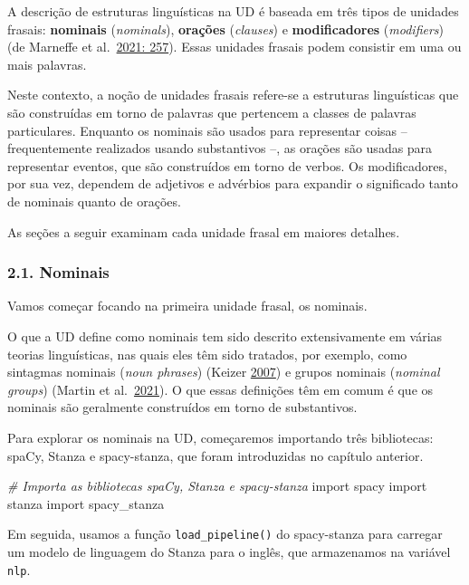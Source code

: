 \documentclass[
  brazilian,
]{article}
\newenvironment{Shaded}{}{}
\newcommand{\CommentTok}[1]{\textcolor[rgb]{0.38,0.63,0.69}{\textit{#1}}}
\newcommand{\ImportTok}[1]{#1}
\newcommand{\NormalTok}[1]{#1}
\begin{document}
A descrição de estruturas linguísticas na UD é baseada em três tipos de
unidades frasais: \textbf{nominais} (\emph{nominals}), \textbf{orações}
(\emph{clauses}) e \textbf{modificadores} (\emph{modifiers}) (de
Marneffe et al.~\href{https://doi.org/10.1162/coli_a_00402}{2021: 257}).
Essas unidades frasais podem consistir em uma ou mais palavras.

Neste contexto, a noção de unidades frasais refere-se a estruturas
linguísticas que são construídas em torno de palavras que pertencem a
classes de palavras particulares. Enquanto os nominais são usados para
representar coisas -- frequentemente realizados usando substantivos --,
as orações são usadas para representar eventos, que são construídos em
torno de verbos. Os modificadores, por sua vez, dependem de adjetivos e
advérbios para expandir o significado tanto de nominais quanto de
orações.

As seções a seguir examinam cada unidade frasal em maiores detalhes.

\hypertarget{nominais}{%
\subsubsection{2.1. Nominais}\label{nominais}}

Vamos começar focando na primeira unidade frasal, os nominais.

O que a UD define como nominais tem sido descrito extensivamente em
várias teorias linguísticas, nas quais eles têm sido tratados, por
exemplo, como sintagmas nominais (\emph{noun phrases}) (Keizer
\href{https://doi.org/10.1017/CBO9780511627699}{2007}) e grupos nominais
(\emph{nominal groups}) (Martin et
al.~\href{https://doi.org/10.1080/00437956.2021.1957545}{2021}). O que
essas definições têm em comum é que os nominais são geralmente
construídos em torno de substantivos.

Para explorar os nominais na UD, começaremos importando três
bibliotecas: spaCy, Stanza e spacy-stanza, que foram introduzidas no
capítulo anterior.

\begin{Shaded}
\begin{Highlighting}[]
\CommentTok{\# Importa as bibliotecas spaCy, Stanza e spacy{-}stanza}
\ImportTok{import}\NormalTok{ spacy}
\ImportTok{import}\NormalTok{ stanza}
\ImportTok{import}\NormalTok{ spacy\_stanza}
\end{Highlighting}
\end{Shaded}

Em seguida, usamos a função \texttt{load\_pipeline()} do spacy-stanza
para carregar um modelo de linguagem do Stanza para o inglês, que
armazenamos na variável \texttt{nlp}.
\end{document}
